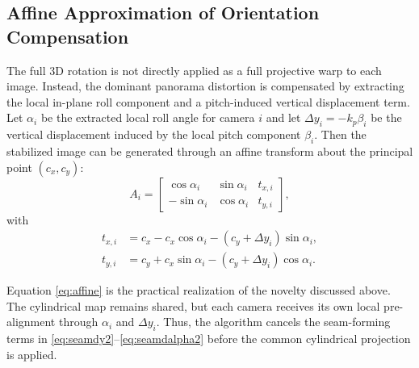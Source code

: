 \documentclass[journal]{IEEEtran}
\begin{document}
\subsection{Affine Approximation of Orientation Compensation}
\label{sec:affine}
The full 3D rotation is not directly applied as a full projective warp to each image. Instead, the dominant panorama distortion is compensated by extracting the local in-plane roll component and a pitch-induced vertical displacement term. Let $\alpha_i$ be the extracted local roll angle for camera $i$ and let $\Delta y_i = -k_p\beta_i$ be the vertical displacement induced by the local pitch component $\beta_i$. Then the stabilized image can be generated through an affine transform about the principal point $(c_x,c_y)$:
\begin{equation}
A_i =
\begin{bmatrix}
\cos\alpha_i & \sin\alpha_i & t_{x,i} \\
-\sin\alpha_i & \cos\alpha_i & t_{y,i}
\end{bmatrix},
\label{eq:affine}
\end{equation}
with
\begin{align}
 t_{x,i} &= c_x - c_x\cos\alpha_i - (c_y + \Delta y_i)\sin\alpha_i, \\
 t_{y,i} &= c_y + c_x\sin\alpha_i - (c_y + \Delta y_i)\cos\alpha_i.
\end{align}

Equation \eqref{eq:affine} is the practical realization of the novelty discussed above. The cylindrical map remains shared, but each camera receives its own local pre-alignment through $\alpha_i$ and $\Delta y_i$. Thus, the algorithm cancels the seam-forming terms in \eqref{eq:seamdy2}--\eqref{eq:seamdalpha2} before the common cylindrical projection is applied.
\end{document}
